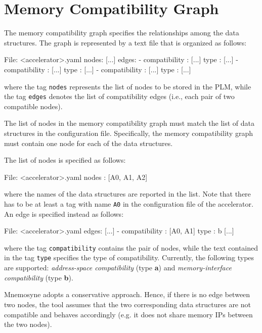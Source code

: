 \section{Memory Compatibility Graph}\label{sec:compatibility}

The memory compatibility graph specifies the relationships among the data
structures. The graph is represented by a text file that is organized as
follows:
\begin{myxml}{File: <accelerator>.yaml}
nodes: [...]
edges:
  - compatibility : [...]
    type          : [...]
  - compatibility : [...]
    type          : [...]
  - compatibility : [...]
    type          : [...]
\end{myxml}
\noindent where the tag {\tt nodes} represents the list of nodes to be
stored in the PLM, while the tag {\tt edges} denotes the list of compatibility edges (i.e., each pair of two compatible nodes).

\begin{lattention}
The list of nodes in the memory compatibility graph must match the
list of data structures in the configuration
file. Specifically, the memory compatibility graph must contain one
node for each of the data structures.
\end{lattention}

\noindent The list of nodes is specified as follows:
\begin{myxml}{File: <accelerator>.yaml}
nodes : [A0, A1, A2]
\end{myxml}
\noindent where the names of the data structures are reported in the list. Note that there has to be at least a tag with name {\tt A0} in the configuration file of the
accelerator.
An edge is specified instead as follows:
\begin{myxml}{File: <accelerator>.yaml}
edges:
    [...]
    - compatibility : [A0, A1]
      type          : b
    [...]
\end{myxml}
\noindent where the tag {\tt compatibility} contains the pair of nodes, while the text contained in 
the tag {\tt type} specifies the type of
compatibility. Currently, the following types are supported: {\em address-space
compatibility} (type {\bf a}) and {\em memory-interface compatibility} (type
{\bf b}).
\begin{lattention}
{\sc Mnemosyne} adopts a conservative approach. Hence, if there is no
edge between two nodes, the tool assumes that the two corresponding
data structures are not compatible and behaves accordingly (e.g. it
does not share memory IPs between the two nodes).
\end{lattention}

